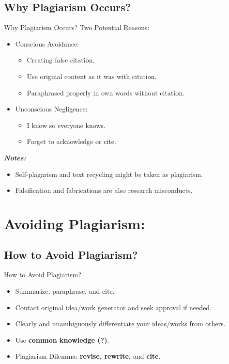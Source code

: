 \documentclass[11pt]{beamer}
\begin{document}
\subsection{Why Plagiarism Occurs?}
\begin{frame}{Why Plagiarism Occurs?}
	Two Potential Reasons:
	\begin{itemize}
		\item Conscious Avoidance:
		\begin{itemize}
			\item Creating false citation.
			\item Use original content as it was with citation.
			\item Paraphrased properly in own words without citation.
		\end{itemize}
		\smallskip
		\item Unconscious Negligence:
		\begin{itemize}
			\item I know so everyone knows.
			\item Forget to acknowledge or cite.
		\end{itemize}
	\end{itemize}
	\textit{\textbf{\color{blue} Notes:}} \\
	\begin{itemize}
	\item Self-plagarism and text recycling might be taken as plagiarism.
	\item Falsification and fabrications are also research misconducts.
	\end{itemize}
\end{frame}

\section{Avoiding Plagiarism:}
\subsection{How to Avoid Plagiarism?}
\begin{frame}{How to Avoid Plagiarism?}
	\begin{itemize}
	\item Summarize, paraphrase, and cite.
	\smallskip
	\item Contact original idea/work generator and seek approval if needed.
	\smallskip
	\item Clearly and unambiguously differentiate your ideas/works from others.
	\smallskip
	\item Use {\color{gray}\textbf {common knowledge (?)}}.
	\smallskip
	\item Plagiarism Dilemma: \textbf{revise, rewrite,} and \textbf{cite}.	
\end{itemize}
\end{frame}
\end{document}
